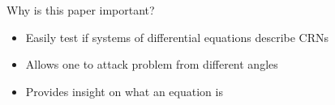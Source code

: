 \begin{frame}{Why is this paper important?}
	\begin{itemize}
		\item Easily test if systems of differential equations describe CRNs
		\item Allows one to attack problem from different angles
		\item Provides insight on what an equation is

	\end{itemize}
\end{frame}
